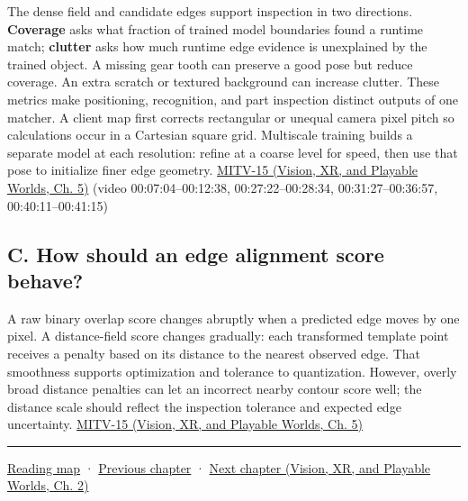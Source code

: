 The dense field and candidate edges support inspection in two directions. \textbf{Coverage} asks what fraction of trained model boundaries found a runtime match; \textbf{clutter} asks how much runtime edge evidence is unexplained by the trained object. A missing gear tooth can preserve a good pose but reduce coverage. An extra scratch or textured background can increase clutter. These metrics make positioning, recognition, and part inspection distinct outputs of one matcher. A client map first corrects rectangular or unequal camera pixel pitch so calculations occur in a Cartesian square grid. Multiscale training builds a separate model at each resolution: refine at a coarse level for speed, then use that pose to initialize finer edge geometry. \href{../07-Vision-XR-and-Playable-Worlds/main.pdf\#nameddest=04-visual-computing-ii-ch036-mitv-15---alignment-patmax-distance-field-filtering-and-sub-sampling-us-7065262}{MITV-15 (Vision, XR, and Playable Worlds, Ch. 5)} (video 00:07:04--00:12:38, 00:27:22--00:28:34, 00:31:27--00:36:57, 00:40:11--00:41:15)

\subsection{C. How should an edge alignment score behave?}\label{04-visual-computing-ii-ch030-c.-how-should-an-edge-alignment-score-behave}

\hypertarget{04-visual-computing-ii-ch030-c.-how-should-an-edge-alignment-score-behave}{}

A raw binary overlap score changes abruptly when a predicted edge moves by one pixel. A distance-field score changes gradually: each transformed template point receives a penalty based on its distance to the nearest observed edge. That smoothness supports optimization and tolerance to quantization. However, overly broad distance penalties can let an incorrect nearby contour score well; the distance scale should reflect the inspection tolerance and expected edge uncertainty. \href{../07-Vision-XR-and-Playable-Worlds/main.pdf\#nameddest=04-visual-computing-ii-ch036-mitv-15---alignment-patmax-distance-field-filtering-and-sub-sampling-us-7065262}{MITV-15 (Vision, XR, and Playable Worlds, Ch. 5)}

\begin{center}\rule{0.5\linewidth}{0.5pt}\end{center}

\hyperref[volume-reading-map]{Reading map} · \hyperref[04-visual-computing-ii-ch029-acceleration-structures-and-robust-queries]{Previous chapter} · \href{../07-Vision-XR-and-Playable-Worlds/main.pdf\#nameddest=04-visual-computing-ii-ch031-learning-a-visual-classifier}{Next chapter (Vision, XR, and Playable Worlds, Ch. 2)}
